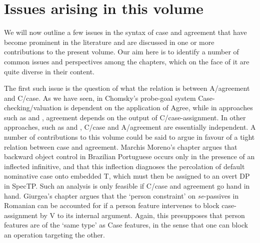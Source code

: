 \documentclass[output=paper]{langsci/langscibook}
\begin{document}
\section{Issues arising in this volume}

We will now outline a few issues in the syntax of case and agreement that have become prominent in the literature and are discussed in one or more contributions to the present volume. Our aim here is to identify a number of common issues and perspectives among the chapters, which on the face of it are quite diverse in their content.

The first such issue is the question of what the relation is between A/agreement and C/case. As we have seen, in Chomsky’s probe-goal system Case-checking/valuation is dependent on the application of Agree, while in approaches such as \citet{Bobaljik2008Phi} and \citet{Preminger2014}, agreement depends on the output of C/case-assignment. In other approaches, such as \citet{Baker2015} and \citet{Manzini2016}, C/case and A/agreement are essentially independent. A number of contributions to this volume could be said to argue in favour of a tight relation between case and agreement. Marchis Moreno’s chapter argues that backward object control in Brazilian Portuguese occurs only in the presence of an inflected infinitive, and that this inflection diagnoses the percolation of default nominative case onto embedded T, which must then be assigned to an overt DP in SpecTP. Such an analysis is only feasible if C/case and agreement go hand in hand. Giurgea’s chapter argues that the ‘person constraint’ on \textit{se}{}-passives in Romanian can be accounted for if a person feature intervenes to block case-assignment by V to its internal argument. Again, this presupposes that person features are of the ‘same type’ as Case features, in the sense that one can block an operation targeting the other.
\end{document}
